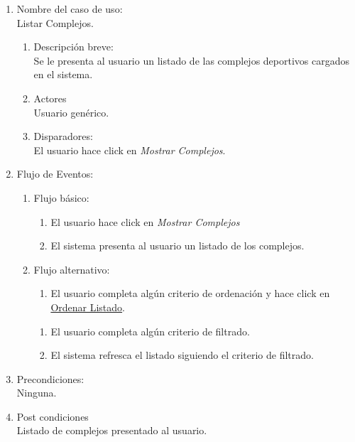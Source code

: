 \documentclass[a4paper,11pt]{article}
\begin{document}
\begin{enumerate}

    \item Nombre del caso de uso: \\
    Listar Complejos.

    \begin{enumerate}
    \item Descripción breve: \\
        Se le presenta al usuario un listado de las complejos deportivos cargados en el sistema.
    \item Actores \\
        Usuario genérico.
    \item Disparadores: \\
        El usuario hace click en \emph{Mostrar Complejos}.
    \end{enumerate}

    \item Flujo de Eventos: \\

    \begin{enumerate}

        \item Flujo básico:\\
        \begin{enumerate}
                    \item El usuario hace click en \emph{Mostrar Complejos}
                    \item El sistema presenta al usuario un listado de los complejos.
        \end{enumerate}
        \item Flujo alternativo:\\
        \begin{enumerate}
                    \item El usuario completa algún criterio de ordenación y
                        hace click en \underline{Ordenar Listado}.
        \end{enumerate}
        \begin{enumerate}
            \item El usuario completa algún criterio de filtrado.
            \item El sistema refresca el listado siguiendo el criterio de filtrado.
        \end{enumerate}
    \end{enumerate}

    \item Precondiciones: \\
        Ninguna.

    \item Post condiciones \\
        Listado de complejos presentado al usuario.

\end{enumerate}
\end{document}
